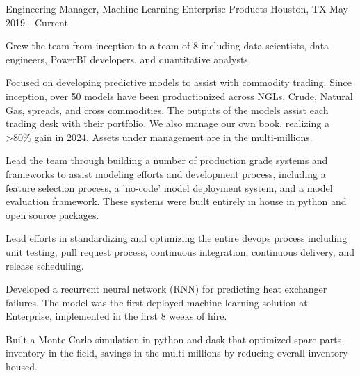 
\begin{cventries}

\cventry
{Engineering Manager, Machine Learning} %
{Enterprise Products} %
{Houston, TX} %
{May 2019 - Current} %
{ %
\begin{cvitems}
\item {Grew the team from inception to a team of 8 including data scientists, data engineers, PowerBI developers, and quantitative analysts.}
\item {Focused on developing predictive models to assist with commodity trading. Since inception, over 50 models have been productionized across NGLs, Crude, Natural Gas, spreads, and cross commodities. The outputs of the models assist each trading desk with their portfolio. We also manage our own book, realizing a >80\% gain in 2024. Assets under management are in the multi-millions.}
\item {Lead the team through building a number of production grade systems and frameworks to assist modeling efforts and development process, including a feature selection process, a 'no-code' model deployment system, and a model evaluation framework. These systems were built entirely in house in python and open source packages.}
\item {Lead efforts in standardizing and optimizing the entire devops process including unit testing, pull request process, continuous integration, continuous delivery, and release scheduling.}
\item {Developed a recurrent neural network (RNN) for predicting heat exchanger failures. The model was the first deployed machine learning solution at Enterprise, implemented in the first 8 weeks of hire.}
\item {Built a Monte Carlo simulation in python and dask that optimized spare parts inventory in the field, savings in the multi-millions by reducing overall inventory housed.}
\end{cvitems}
}


\end{cventries}
